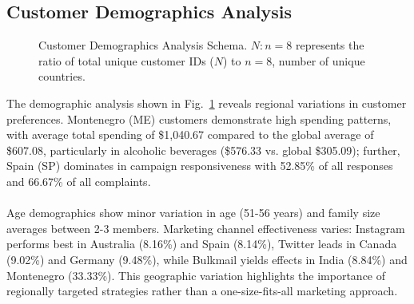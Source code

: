 \documentclass[12pt,a4paper]{article}
\begin{document}
\subsection{Customer Demographics Analysis}
\begin{figure}[!htbp]
\centering
{}
\caption{Customer Demographics Analysis Schema. $N:n=8$ represents the ratio of total unique customer IDs ($N$) to $n=8$, number of unique countries.}
\label{fig:demographics-schema}
\end{figure}
\noindent The demographic analysis shown in Fig.~\ref{fig:demographics-schema} reveals regional variations in customer preferences. Montenegro (ME) customers demonstrate high spending patterns, with average total spending of \$1,040.67 compared to the global average of \$607.08, particularly in alcoholic beverages (\$576.33 vs. global \$305.09); further, Spain (SP) dominates in campaign responsiveness with 52.85\% of all responses and 66.67\% of all complaints.\\
\\
Age demographics show minor variation in age (51-56 years) and family size averages between 2-3 members. Marketing channel effectiveness varies: Instagram performs best in Australia (8.16\%) and Spain (8.14\%), Twitter leads in Canada (9.02\%) and Germany (9.48\%), while Bulkmail yields effects in India (8.84\%) and Montenegro (33.33\%). This geographic variation highlights the importance of regionally targeted strategies rather than a one-size-fits-all marketing approach.
\end{document}
